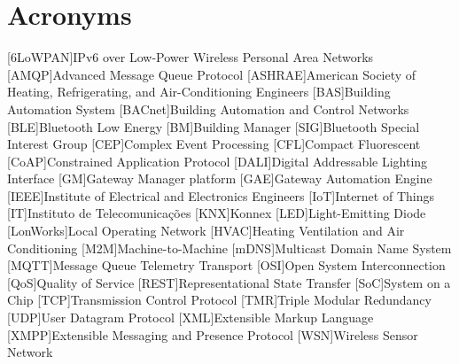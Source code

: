 \chapter{Acronyms}

\footnotesize
\SingleSpacing

\begin{multicols}{2}
\begin{acronym}[AAAAAA]
	[6LoWPAN]{IPv6 over Low-Power Wireless Personal Area Networks}
	[AMQP]{Advanced Message Queue Protocol}
	[ASHRAE]{American Society of Heating, Refrigerating, and Air-Conditioning Engineers}
	[BAS]{Building Automation System}
	[BACnet]{Building Automation and Control Networks}
	[BLE]{Bluetooth Low Energy}
	[BM]{Building Manager}
	[SIG]{Bluetooth Special Interest Group}
	[CEP]{Complex Event Processing}
	[CFL]{Compact Fluorescent}
	[CoAP]{Constrained Application Protocol}
	[DALI]{Digital Addressable Lighting Interface}
	[GM]{Gateway Manager platform}
	[GAE]{Gateway Automation Engine}
	[IEEE]{Institute of Electrical and Electronics Engineers}
	[IoT]{Internet of Things}
	[IT]{Instituto de Telecomunicações}
	[KNX]{Konnex}
	[LED]{Light-Emitting Diode}
	[LonWorks]{Local Operating Network}
	[HVAC]{Heating Ventilation and Air Conditioning}
	[M2M]{Machine-to-Machine}
	[mDNS]{Multicast Domain Name System}
	[MQTT]{Message Queue Telemetry Transport}
	[OSI]{Open System Interconnection}
	[QoS]{Quality of Service}
	[REST]{Representational State Transfer}
	[SoC]{System on a Chip}
	[TCP]{Transmission Control Protocol}
	[TMR]{Triple Modular Redundancy}
	[UDP]{User Datagram Protocol}
	[XML]{Extensible Markup Language}
	[XMPP]{Extensible Messaging and Presence Protocol}
	[WSN]{Wireless Sensor Network}
	


\end{acronym}
\end{multicols}

